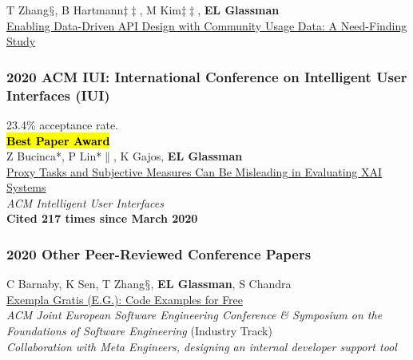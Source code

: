 \documentclass[10pt, a4paper]{article}
\newcommand{\years}[1]{\marginnote{\normalsize #1}}
\begin{document}
\years{\textbf{C16}}T Zhang$\mathsection$, B Hartmann$\ddagger\ddagger$, M Kim$\ddagger\ddagger$, \textbf{EL Glassman}\\
\href{http://glassmanlab.seas.harvard.edu/papers/Data-driven-API-CHI20.pdf}{Enabling Data-Driven API Design with Community Usage Data: A Need-Finding Study}

\subsubsection*{2020 ACM \textbf{IUI}: International Conference on Intelligent User Interfaces (IUI)}
23.4\% acceptance rate.\\



\years{\textbf{C15}}\hl{\textbf{Best Paper Award}}\\
Z Bucinca*, P Lin*$\|$, K Gajos, \textbf{EL Glassman}\\
\href{http://glassmanlab.seas.harvard.edu/papers/bucinca_iui20_proxy.pdf}{Proxy Tasks and Subjective Measures Can Be Misleading in Evaluating XAI Systems}\\
\emph{ACM Intelligent User Interfaces}\\
\textbf{Cited 217 times since March 2020}

\subsubsection*{2020 Other Peer-Reviewed Conference Papers}

\years{2020 FSE\\ \textbf{C14}}C Barnaby, K Sen, T Zhang$\mathsection$, \textbf{EL Glassman}, S Chandra\\
\href{http://glassmanlab.seas.harvard.edu/papers/fse2020-industry-example-generation.pdf}{Exempla Gratis (E.G.): Code Examples for Free}\\
\emph{ACM Joint European Software Engineering Conference \& Symposium on the Foundations of Software Engineering} (Industry Track)\\
\textit{Collaboration with Meta Engineers, designing an internal developer support tool}
\end{document}
